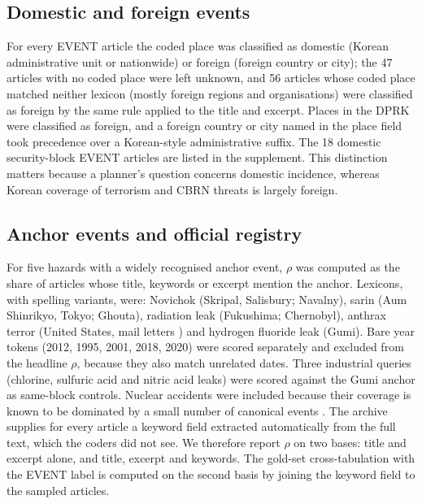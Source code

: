 \documentclass[1p,times]{elsarticle}
\begin{document}
\subsection{Domestic and foreign events}
For every EVENT article the coded place was classified as domestic (Korean administrative unit or nationwide) or foreign (foreign country or city); the 47 articles with no coded place were left unknown, and 56 articles whose coded place matched neither lexicon (mostly foreign regions and organisations) were classified as foreign by the same rule applied to the title and excerpt. Places in the DPRK were classified as foreign, and a foreign country or city named in the place field took precedence over a Korean-style administrative suffix. The 18 domestic security-block EVENT articles are listed in the supplement. This distinction matters because a planner's question concerns domestic incidence, whereas Korean coverage of terrorism and CBRN threats is largely foreign.

\subsection{Anchor events and official registry}
For five hazards with a widely recognised anchor event, $\rho$ was computed as the share of articles whose title, keywords or excerpt mention the anchor. Lexicons, with spelling variants, were: Novichok (Skripal, Salisbury; Navalny), sarin (Aum Shinrikyo, Tokyo; Ghouta), radiation leak (Fukushima; Chernobyl), anthrax terror (United States, mail letters \cite{jernigan2002}) and hydrogen fluoride leak (Gumi). Bare year tokens (2012, 1995, 2001, 2018, 2020) were scored separately and excluded from the headline $\rho$, because they also match unrelated dates. Three industrial queries (chlorine, sulfuric acid and nitric acid leaks) were scored against the Gumi anchor as same-block controls. Nuclear accidents were included because their coverage is known to be dominated by a small number of canonical events \cite{friedman2011}. The archive supplies for every article a keyword field extracted automatically from the full text, which the coders did not see. We therefore report $\rho$ on two bases: title and excerpt alone, and title, excerpt and keywords. The gold-set cross-tabulation with the EVENT label is computed on the second basis by joining the keyword field to the sampled articles.
\end{document}
